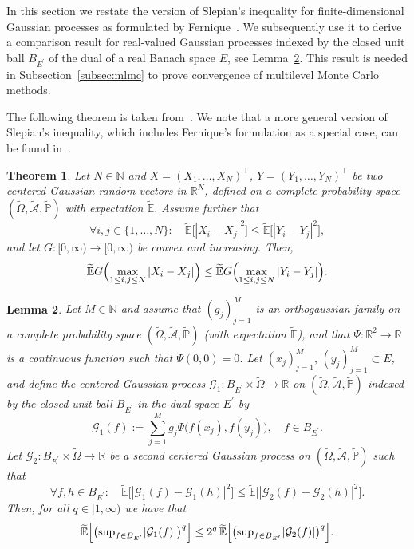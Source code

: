 \documentclass[reqno]{amsart}
\numberwithin{equation}{section}
\newcommand{\bbE}{\mathbb{E}}
\newcommand{\bbN}{\mathbb{N}}
\newcommand{\bbP}{\mathbb{P}}
\newcommand{\bbR}{\mathbb{R}}
\newcommand{\cA}{\mathcal{A}}
\newcommand{\cG}{\mathcal{G}}
\newcommand{\Omegat}{\widetilde{\Omega}}
\newcommand{\cAt}{\widetilde{\cA}}
\newcommand{\bbPt}{\widetilde{\bbP}}
\newcommand{\bbEt}{\widetilde{\bbE}}
\newcommand{\dual}[1]{{#1}^{\prime}}
\newcommand{\from}{\colon}
\newtheorem{lemma}{Lemma}[section]
\newtheorem{theorem}[lemma]{Theorem}
\theoremstyle{remark}
\theoremstyle{definition}
\begin{document}
In this section we restate the version of Slepian's inequality 
for finite-dimensional Gaussian processes as 
formulated by Fernique~\cite{Fernique1975}. 
We subsequently use it to derive a comparison result for 
real-valued Gaussian processes indexed by the closed unit ball 
$B_{\dual{E}}$ of the dual of a real Banach space $E$, 
see Lemma~\ref{lem:slepian}. 
This result is 
needed in Subsection~\ref{subsec:mlmc} 
to prove convergence 
of multilevel Monte Carlo methods. 

The following theorem is taken from~\cite[Theorem~2.1.2]{Fernique1975}. 
We note that a more general version of Slepian's inequality, 
which includes Fernique's formulation 
as a special case, can be found 
in~\cite[Theorem~2.8]{HoffmannJorgensen2013}.  

\begin{theorem}\label{thm:slepian} 
	Let $N\in\bbN$ and 
	$X = (X_1,\ldots,X_N)^\top$\!,  
	$Y = (Y_1,\ldots,Y_N)^\top$ be 
	two centered Gaussian 
	random vectors 
	in $\bbR^N$\!, defined 
	on a complete probability space 
	$(\Omegat,\cAt,\bbPt)$ 
	with expectation $\bbEt$. 
	Assume further that 
	\[
		\forall i,j\in\{1,\ldots,N\}: 
		\quad 
		\bbEt\bigl[ |X_i - X_j|^2 \bigr] 
		\leq 
		\bbEt\bigl[ |Y_i - Y_j|^2 \bigr] , 
	\]
	and let $G \from [0,\infty)\to [0,\infty)$ 
	be convex and increasing. Then, 
	\[
		\bbEt G \Bigl( \max_{1\leq i,j \leq N} |X_i - X_j| \Bigr) 
		\leq 
		\bbEt G \Bigl( \max_{1\leq i,j \leq N} |Y_i - Y_j| \Bigr) . 
	\]
\end{theorem}  
	
\begin{lemma}\label{lem:slepian} 
	Let $M\in\bbN$ and assume that 
	$(g_j)_{j=1}^M$ is 
	an orthogaussian family 
	on a complete probability space 
	$(\Omegat,\cAt,\bbPt)$ 
	(with expectation $\bbEt$), 
	and that $\Psi \from\bbR^2\to\bbR$ 
	is a continuous function 
	such that $\Psi(0,0)=0$. 
	Let $( x_j )_{j=1}^M, \, ( y_j)_{j=1}^M \subset E$, 
	and define the 
	centered Gaussian process 
	$\cG_1 \from B_{\dual{E}\!} \times \Omegat \to \bbR$ 
	on $(\Omegat,\cAt,\bbPt)$ 
	indexed by the closed unit ball $B_{\dual{E}\!}$ 
	in the dual space $\dual{E}$ by 
	\begin{equation}\label{eq:defG1}
		\cG_1(f) 
		:= 
		\sum_{j=1}^M 
		g_j  \Psi\bigl( f(x_j), f(y_j) \bigr) , 
		\quad 
		f\in B_{\dual{E}\!}. 
	\end{equation}
	Let $\cG_2 \from B_{\dual{E}\!} \times \Omegat \to \bbR$ 
	be a second centered Gaussian process on 
	$(\Omegat,\cAt,\bbPt)$ such that 
	\begin{equation}\label{eq:ass:slepian} 
		\forall f,h \in B_{\dual{E}\!}: 
		\quad 
		\bbEt\bigl[ |\cG_1(f) - \cG_1(h)|^2\bigr] 
		\leq 
		\bbEt\bigl[ |\cG_2(f) - \cG_2(h)|^2\bigr]. 
	\end{equation}
	Then, for all $q\in[1,\infty)$ we have that 
	\begin{equation}\label{eq:lem:slepian} 
		\bbEt\Bigl[ 
		\bigl(\sup\nolimits_{f \in B_{\dual{E}} \!} 
		|\cG_1(f) | \bigr)^q \Bigr] 
		\leq 
		2^q \, 
		\bbEt\Bigl[
		\bigl(\sup\nolimits_{f \in B_{\dual{E}} \!} 
		|\cG_2(f) | \bigr)^q \Bigr]. 
	\end{equation}
\end{lemma} 
\end{document}
